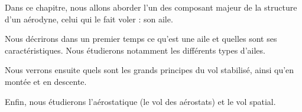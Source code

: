 Dans ce chapitre, nous allons aborder l'un des composant majeur de la structure d'un aérodyne, celui qui le fait voler : son aile.

Nous décrirons dans un premier temps ce qu'est une aile et quelles sont ses caractéristiques. Nous étudierons notamment les différents types d'ailes.

Nous verrons ensuite quels sont les grands principes du vol stabilisé, ainsi qu'en montée et en descente.

Enfin, nous étudierons l'aérostatique (le vol des aérostats) et le vol spatial.